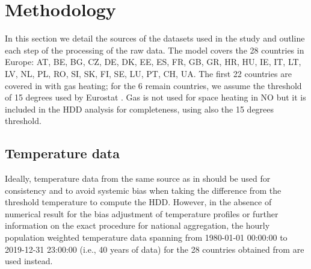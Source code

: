 \documentclass[12pt]{article}
\begin{document}
\section{Methodology}
In this section we detail the sources of the datasets used in the study and outline each step of the processing of the raw data. The model covers the 28 countries in Europe: AT, BE, BG, CZ, DE, DK, EE, ES, FR, GB, GR, HR, HU, IE, IT, LT, LV, NL, PL, RO, SI, SK, FI, SE, LU, PT, CH, UA. The first 22 countries are covered in \cite{KOZARCANIN2019368} with gas heating; for the 6 remain countries, we assume the threshold of 15 degrees used by Eurostat \cite{Eurostat_hdd}. Gas is not used for space heating in NO but it is included in the HDD analysis for completeness, using also the 15 degrees threshold. 

\subsection{Temperature data}
Ideally, temperature data from the same source as in \cite{KOZARCANIN2019368} should be used for consistency and to avoid systemic bias when taking the difference from the threshold temperature to compute the HDD. However, in the absence of numerical result for the bias adjustment of temperature profiles or further information on the exact procedure for national aggregation, the hourly population weighted temperature data spanning from 1980-01-01 00:00:00 to 2019-12-31 23:00:00 (i.e., 40 years of data) for the 28 countries obtained from \cite{ninja} are used instead. 
\end{document}
